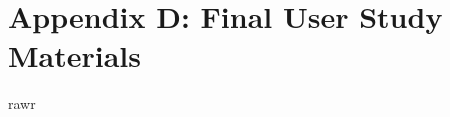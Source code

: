 \section{Appendix D: Final User Study
Materials}\label{appendix-d-final-user-study-materials}

rawr
